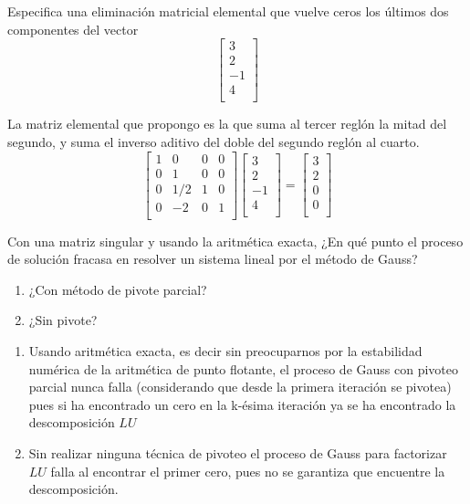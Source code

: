 \documentclass[paper=letter, fontsize=11pt]{scrartcl}
\numberwithin{equation}{section} %
\numberwithin{figure}{section} %
\numberwithin{table}{section} %
\newenvironment{cframed}[1][blue]
  {\begin{tcolorbox}[colframe=#1,colback=white]}
  {\end{tcolorbox}}
\begin{document}
\begin{enumerate}
\begin{cframed}[purple]
\item Especifica una eliminación matricial elemental que vuelve ceros los últimos dos componentes del vector
\[
\begin{bmatrix}
 3   \\
 2\\
 -1 \\
 4\\
\end{bmatrix}
\]
\end{cframed}
La matriz elemental que propongo es la que suma al tercer reglón la mitad del segundo, y suma el inverso aditivo del doble del segundo reglón al cuarto.
\[
\begin{bmatrix}
1 & 0& 0 & 0   \\
0 & 1& 0& 0\\
0 & 1/2 & 1 & 0 \\
0& -2 & 0 & 1\\
\end{bmatrix}
\begin{bmatrix}
 3   \\
 2\\
 -1 \\
 4\\
\end{bmatrix} = \begin{bmatrix}
 3   \\
 2\\
 0 \\
 0\\
\end{bmatrix}
\]

\begin{cframed}[green]
\item Con una matriz singular y usando la aritmética exacta, ¿En qué punto el proceso de solución fracasa en resolver un sistema lineal por el método de Gauss?
\begin{enumerate}
\item ¿Con método de pivote parcial?
\item ¿Sin pivote? 
\end{enumerate}
\end{cframed}
\begin{enumerate}
\item Usando aritmética exacta, es decir sin preocuparnos por la estabilidad numérica de la aritmética de punto flotante, el proceso de Gauss con pivoteo parcial nunca falla (considerando que desde la primera iteración se pivotea) pues si ha encontrado un cero en la k-ésima iteración ya se ha encontrado la descomposición $LU$
\item Sin realizar ninguna técnica de pivoteo el proceso de Gauss para factorizar $LU$ falla al encontrar el primer cero, pues no se garantiza que encuentre la descomposición.
\end{enumerate}


\end{enumerate}
\end{document}
